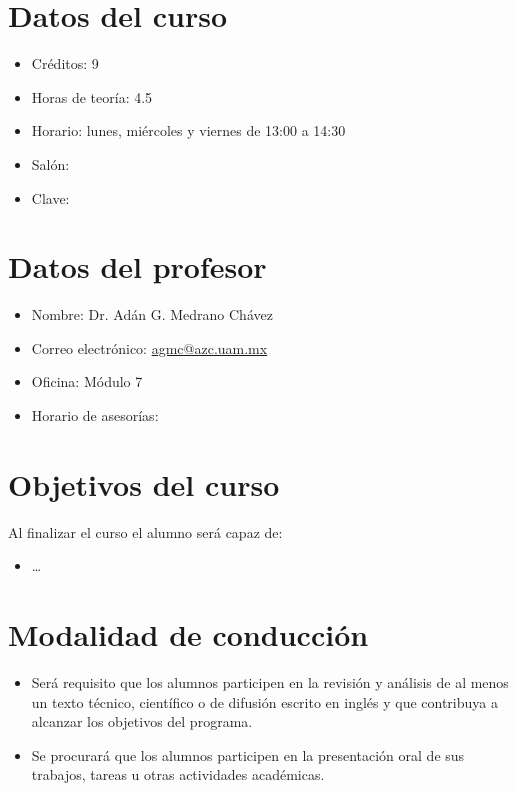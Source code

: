 \documentclass[10pt,letterpaper]{article}
\begin{document}
\begin{multicols}{2}

\section*{Datos del curso}
\color{black}
\begin{itemize}
	\itemsep-0.2em
	\item Créditos: 9
	\item Horas de teoría: 4.5 
	\item Horario: lunes, miércoles y viernes de 13:00 a 14:30
	\item Salón: 
	\item Clave: 
\end{itemize}

\section*{Datos del profesor}
\color{black}
\begin{itemize}
  \itemsep-0.2em
  \item Nombre: Dr. Adán G. Medrano Chávez
  \item Correo electrónico: \href{mailto:agmc@azc.uam.mx}{agmc@azc.uam.mx}
  \item Oficina: Módulo 7
  \item Horario de asesorías: 
\end{itemize}

\section*{Objetivos del curso}
\color{black}
Al finalizar el curso el alumno será capaz de:
\begin{itemize}
  \itemsep-0.2em
	\item \dots
\end{itemize}

\section*{Modalidad de conducción}
\color{black}
\begin{itemize}
  \itemsep-0.2em
	\item Será requisito que los alumnos participen en la revisión y análisis de al 
	menos un texto técnico, científico o de difusión escrito en inglés y que 
	contribuya a alcanzar los objetivos del programa.
	\item Se procurará que los alumnos participen en la presentación oral de sus 
	trabajos, tareas u otras actividades académicas.
\end{itemize}


\end{multicols}
\end{document}
